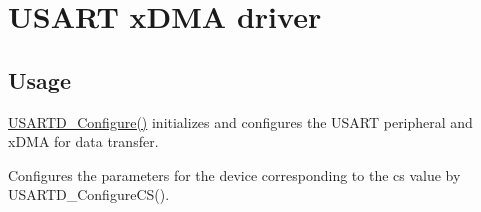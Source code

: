 \hypertarget{group__usart__dma__module}{}\section{U\+S\+A\+RT x\+D\+MA driver}
\label{group__usart__dma__module}
\hypertarget{group__RTEMSBSPsARM_Usage}{}\subsection{Usage}\label{group__RTEMSBSPsARM_Usage}

\begin{DoxyItemize}
\item \mbox{\hyperlink{usart__dma_8c_a0f760ac1d4ebf29b670399b45ba1ee33}{U\+S\+A\+R\+T\+D\+\_\+\+Configure()}} initializes and configures the U\+S\+A\+RT peripheral and x\+D\+MA for data transfer. 
\item Configures the parameters for the device corresponding to the cs value by U\+S\+A\+R\+T\+D\+\_\+\+Configure\+C\+S().  
\end{DoxyItemize}